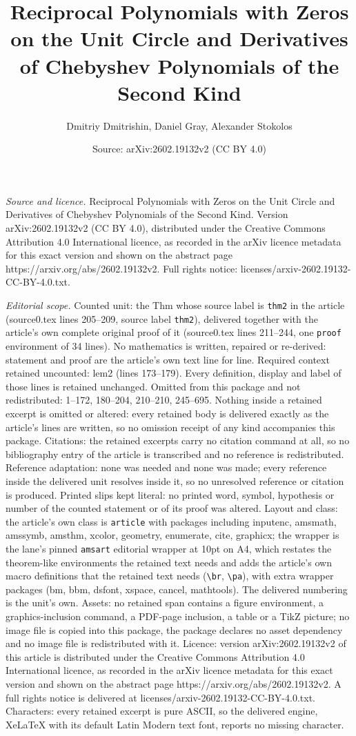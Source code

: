 \documentclass[10pt,a4paper]{amsart}
\title[Reciprocal Polynomials with Zeros on the Unit Circle and Der]{Reciprocal Polynomials with Zeros on the Unit Circle and Derivatives of Chebyshev Polynomials of the Second Kind}
\author{Dmitriy Dmitrishin, Daniel Gray, Alexander Stokolos}
\date{Source: arXiv:2602.19132v2 (CC BY 4.0)}
\begin{document}
\maketitle

\noindent\emph{Source and licence.} Reciprocal Polynomials with Zeros on the Unit Circle and Derivatives of Chebyshev Polynomials of the Second Kind. Version arXiv:2602.19132v2 (CC BY 4.0), distributed under the Creative Commons Attribution 4.0 International licence, as recorded in the arXiv licence metadata for this exact version and shown on the abstract page https://arxiv.org/abs/2602.19132v2. Full rights notice: licenses/arxiv-2602.19132-CC-BY-4.0.txt.\par\smallskip

\noindent\textit{Editorial scope.} Counted unit: the Thm whose source label is \texttt{thm2} in the article (source0.tex lines 205--209, source label \texttt{thm2}), delivered together with the article's own complete original proof of it (source0.tex lines 211--244, one \texttt{proof} environment of 34 lines). No mathematics is written, repaired or re-derived: statement and proof are the article's own text line for line. Required context retained uncounted: lem2 (lines 173--179). Every definition, display and label of those lines is retained unchanged. Omitted from this package and not redistributed: 1--172, 180--204, 210--210, 245--695. Nothing inside a retained excerpt is omitted or altered: every retained body is delivered exactly as the article's lines are written, so no omission receipt of any kind accompanies this package. Citations: the retained excerpts carry no citation command at all, so no bibliography entry of the article is transcribed and no reference is redistributed. Reference adaptation: none was needed and none was made; every reference inside the delivered unit resolves inside it, so no unresolved reference or citation is produced. Printed slips kept literal: no printed word, symbol, hypothesis or number of the counted statement or of its proof was altered. Layout and class: the article's own class is \texttt{article} with packages including inputenc, amsmath, amssymb, amsthm, xcolor, geometry, enumerate, cite, graphicx; the wrapper is the lane's pinned \texttt{amsart} editorial wrapper at 10pt on A4, which restates the theorem-like environments the retained text needs and adds the article's own macro definitions that the retained text needs (\texttt{\textbackslash br}, \texttt{\textbackslash pa}), with extra wrapper packages (bm, bbm, dsfont, xspace, cancel, mathtools). The delivered numbering is the unit's own. Assets: no retained span contains a figure environment, a graphics-inclusion command, a PDF-page inclusion, a table or a TikZ picture; no image file is copied into this package, the package declares no asset dependency and no image file is redistributed with it. Licence: version arXiv:2602.19132v2 of this article is distributed under the Creative Commons Attribution 4.0 International licence, as recorded in the arXiv licence metadata for this exact version and shown on the abstract page https://arxiv.org/abs/2602.19132v2. A full rights notice is delivered at licenses/arxiv-2602.19132-CC-BY-4.0.txt. Characters: every retained excerpt is pure ASCII, so the delivered engine, XeLaTeX with its default Latin Modern text font, reports no missing character.
\end{document}
